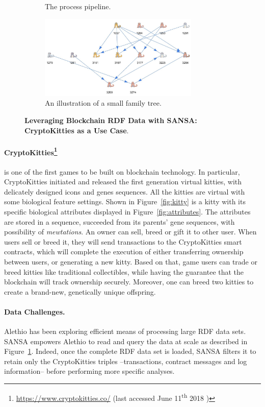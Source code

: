 \begin{figure}[t]
\begin{subfigure}[b]{0.5\textwidth}
\caption{The process pipeline.}
\label{fig:pipeline}
\end{subfigure}
\begin{subfigure}[b]{0.5\textwidth}
\centering
\includegraphics[height=4cm,width=\textwidth]{images/7_implemenation_and_usecases/incest-crop.jpeg}
\caption{An illustration of a small family tree.}
\label{fig:incest}
\end{subfigure}
\caption{\textbf{Leveraging Blockchain RDF Data with SANSA: CryptoKitties as a Use Case}.}
\label{fig:crypto-sansa}
\end{figure}

\paragraph*{CryptoKitties\footnote{\url{https://www.cryptokitties.co/} (last accessed June 11\textsuperscript{th} 2018 )}} is one of the first games to be built on blockchain technology.
In particular, CryptoKitties initiated and released the first generation virtual kitties, with delicately designed icons and genes sequences. 
All the kitties are virtual with some biological feature settings. 
Shown in Figure~\ref{fig:kitty} is a kitty with its specific biological attributes displayed in Figure~\ref{fig:attributes}. 
The attributes are stored in a sequence, succeeded from its parents' gene sequences, with possibility of \textit{mewtations}.
An owner can sell, breed or gift it to other user.
When users sell or breed it, they will send transactions to the CryptoKitties smart contracts, which will complete the execution of either transferring ownership between users, or generating a new kitty.
Based on that, game users can trade or breed kitties like traditional collectibles, while having the guarantee that the blockchain will track ownership securely. 
Moreover, one can breed two kitties to create a brand-new, genetically unique offspring.

\paragraph*{Data Challenges.}
Alethio has been exploring efficient means of processing large \gls{RDF} data sets. 
SANSA empowers Alethio to read and query the data at scale as described in Figure~\ref{fig:pipeline}. 
Indeed, once the complete \gls{RDF} data set is loaded, SANSA filters it to retain only the CryptoKitties triples --transactions, contract messages and log information-- before performing more specific analyses.

